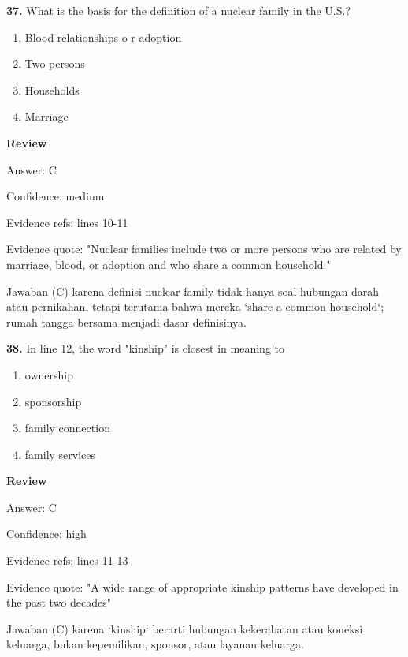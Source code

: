 \documentclass[12pt]{article}
\begin{document}
\vspace{0.25\baselineskip}
\noindent\textbf{37.} What is the basis for the definition of a nuclear family in the U.S.?
\begin{enumerate}[label=(\Alph*),leftmargin=*,itemsep=0.2em]
\item Blood relationships o r adoption
\item Two persons
\item Households
\item Marriage
\end{enumerate}
\par
\begingroup
\setlength{\parskip}{0pt}
\setlength{\parindent}{0pt}
\textbf{Review}\par
Answer: C\par
Confidence: medium\par
Evidence refs: lines 10-11\par
Evidence quote: "Nuclear families include two or more persons who are related by marriage, blood, or adoption and who share a common household."\par
Jawaban (C) karena definisi nuclear family tidak hanya soal hubungan darah atau pernikahan, tetapi terutama bahwa mereka `share a common household`; rumah tangga bersama menjadi dasar definisinya.\par
\endgroup
\par
\vspace{0.25\baselineskip}
\noindent\textbf{38.} In line 12, the word "kinship" is closest in meaning to
\begin{enumerate}[label=(\Alph*),leftmargin=*,itemsep=0.2em]
\item ownership
\item sponsorship
\item family connection
\item family services
\end{enumerate}
\par
\begingroup
\setlength{\parskip}{0pt}
\setlength{\parindent}{0pt}
\textbf{Review}\par
Answer: C\par
Confidence: high\par
Evidence refs: lines 11-13\par
Evidence quote: "A wide range of appropriate kinship patterns have developed in the past two decades"\par
Jawaban (C) karena `kinship` berarti hubungan kekerabatan atau koneksi keluarga, bukan kepemilikan, sponsor, atau layanan keluarga.\par
\end{document}
